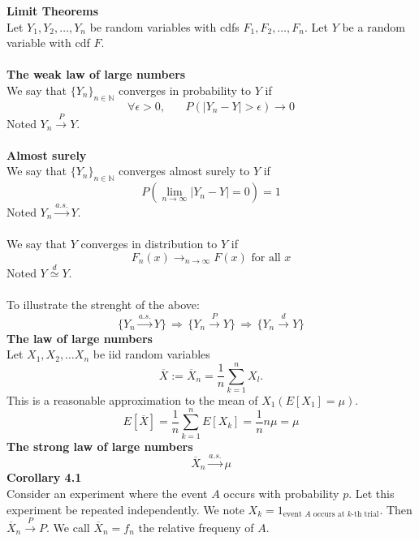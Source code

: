 \documentclass[12pt,a4paper,draft]{report}
\author{Frederik Appel Vardinghus-Nielsen}
\begin{document}
\noindent\textbf{Limit Theorems}\\
Let $Y_1,Y_2,\ldots,Y_n$ be random variables with cdfs $F_1,F_2,\ldots,F_n$. Let $Y$ be a random variable with cdf $F$.\\\\
\textbf{The weak law of large numbers}\\
We say that $\{Y_n\}_{n\in\mathbb{N}}$ converges in probability to $Y$ if
\begin{equation}
\forall\epsilon >0,\phantom{mm}P(|Y_n-Y|>\epsilon)\to 0
\end{equation}
Noted $Y_n\overset{P}\to Y$.\\\\
\textbf{Almost surely}\\
We say that $\{Y_n\}_{n\in\mathbb{N}}$ converges almost surely to $Y$ if
\begin{equation}
P(\lim_{n\to\infty}|Y_n-Y|=0)=1
\end{equation}
Noted $Y_n\overset{a.s.}\to Y$.\\\\
We say that $Y$ converges in distribution to $Y$ if
\begin{equation}
F_n(x)\to_{n\to\infty}F(x)\text{ for all } x
\end{equation}
Noted $Y\overset{d}\simeq Y$.\\\\
To illustrate the strenght of the above:
\begin{equation}
\{Y_n\overset{a.s.}\to Y\}\,\Rightarrow\,\{Y_n\overset{P}\to Y\}\,\Rightarrow\,\{Y_n\overset{d}\to Y\}
\end{equation}
\textbf{The law of large numbers}\\
Let $X_1,X_2,\ldots X_n$ be iid random variables
\begin{equation}
\overline{X}:=\overline{X}_n=\frac{1}{n}\sum_{k=1}^nX_l.
\end{equation}
This is a reasonable approximation to the mean of $X_1(E[X_1]=\mu)$.
\begin{equation}
E[\overline{X}]=\frac{1}{n}\sum_{k=1}^nE[X_k]=\frac{1}{n}n\mu=\mu
\end{equation}
\textbf{The strong law of large numbers}\\
\begin{equation}
\overline{X}_n\overset{a.s.}\to\mu
\end{equation}
\textbf{Corollary 4.1}\\
Consider an experiment where the event $A$ occurs with probability $p$. Let this experiment be repeated independently. We note $X_k=1_{\text{event $A$ occurs at $k$-th trial}}$. Then $\overline{X}_n\overset{P}\to P$. We call $\overline{X}_n=f_n$ the relative frequeny of $A$.\\\\
\end{document}
